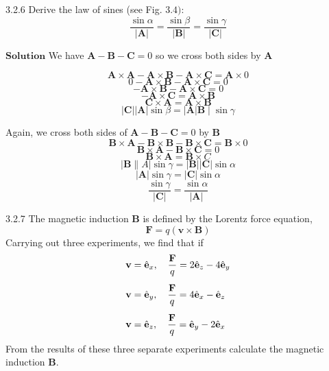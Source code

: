 \newpage



\begin{mybox}{3.2.6}
Derive the law of sines (see Fig. $3.4):$
$$
\dfrac{\sin \alpha}{|\mathbf{A}|}=\dfrac{\sin \beta}{|\mathbf{B}|}=\dfrac{\sin \gamma}{|\mathbf{C}|}
$$
\end{mybox}


$\boxed{\textbf{Solution}}$ We have $\mathbf{A}-\mathbf{B}-\mathbf{C}=0$ so we cross both sides by $\mathbf{A}$ 



$$\mathbf{A} \times \mathbf{A}-\mathbf{A} \times \mathbf{B}-\mathbf{A} \times \mathbf{C}=\mathbf{A} \times 0$$
$$ 0-\mathbf{A} \times \mathbf{B}-\mathbf{A} \times \mathbf{C}=0$$
$$-\mathbf{A} \times \mathbf{B}-\mathbf{A} \times \mathbf{C}=0$$
$$-\mathbf{A} \times \mathbf{C}=\mathbf{A} \times \mathbf{B}$$
$$ \mathbf{C} \times \mathbf{A}=\mathbf{A} \times \mathbf{B}$$
$$|\mathbf{C}||\mathbf{A}| \sin \beta=|\mathbf{A}| \mathbf{B} \mid \sin \gamma$$

Again, we cross both sides of $\mathbf{A}-\mathbf{B}-\mathbf{C}=0$ by $\mathbf{B}$
$$\mathbf{B} \times \mathbf{A}-\mathbf{B} \times \mathbf{B}-\mathbf{B} \times \mathbf{C}=\mathbf{B} \times 0$$
$$ \mathbf{B} \times \mathbf{A}-\mathbf{B} \times \mathbf{C}=0$$
$$ \mathbf{B} \times \mathbf{A}=\mathbf{B} \times C$$
$$|\mathbf{B} \| A| \sin \gamma=|\mathbf{B}||\mathbf{C}| \sin \alpha$$
$$|\mathbf{A}| \sin \gamma=|\mathbf{C}| \sin \alpha$$
$$ \frac{\sin \gamma}{|\mathbf{C}|}=\frac{\sin \alpha}{|\mathbf{A}|} $$



\newpage



\begin{mybox}{3.2.7}
The magnetic induction $\mathbf{B}$ is defined by the Lorentz force equation,
$$
\mathbf{F}=q(\mathbf{v} \times \mathbf{B})
$$
Carrying out three experiments, we find that if
$$
\begin{array}{l}{\mathbf{v}=\hat{\mathbf{e}}_{x}, \quad \dfrac{\mathbf{F}}{q}=2 \hat{\mathbf{e}}_{z}-4 \hat{\mathbf{e}}_{y}}\vspace{3mm} \\ {\mathbf{v}=\hat{\mathbf{e}}_{y}, \quad \dfrac{\mathbf{F}}{q}=4 \hat{\mathbf{e}}_{x}-\hat{\mathbf{e}}_{z}} \vspace{3mm}\\ {\mathbf{v}=\hat{\mathbf{e}}_{z}, \quad \dfrac{\mathbf{F}}{q}=\hat{\mathbf{e}}_{y}-2 \hat{\mathbf{e}}_{x}}\end{array}
$$
From the results of these three separate experiments calculate the magnetic induction $\mathbf{B}$.
\end{mybox}



